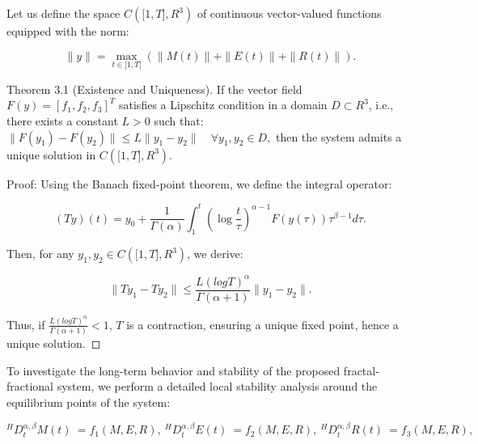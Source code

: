 \documentclass[10pt]{NSP1}
\begin{document}
Let us define the space $C\left( \lbrack 1,T\rbrack,R^{3} \right)$ of continuous vector-valued functions equipped with the norm:

\begin{equation}
\parallel y \parallel = \max_{t \in \lbrack 1,T\rbrack}\left( \parallel M(t) \parallel + \parallel E(t) \parallel + \parallel R(t) \parallel \right).

\end{equation}

Theorem 3.1 (Existence and Uniqueness). If the vector field $F(y) = \left\lbrack f_{1},f_{2},f_{3} \right\rbrack^{T}$ satisfies a Lipschitz condition in a domain $D \subset R^{3}$, i.e., there exists a constant $L > 0$ such that: $\parallel F\left( y_{1} \right) - F\left( y_{2} \right) \parallel \leq L \parallel y_{1} - y_{2} \parallel \quad\forall y_{1},y_{2} \in D,$ then the system admits a unique solution in $C\left( \lbrack 1,T\rbrack,R^{3} \right)$.

Proof: Using the Banach fixed-point theorem, we define the integral operator:

\begin{equation}
(Ty)(t) = y_{0} + \frac{1}{\Gamma(\alpha)}\int_{1}^{t}{}\left( \log\frac{t}{\tau} \right)^{\alpha - 1}F\left( y(\tau) \right)\tau^{\beta - 1}d\tau.

\end{equation}

Then, for any $y_{1},y_{2} \in C\left( \lbrack 1,T\rbrack,R^{3} \right)$, we derive:

\begin{equation}
\parallel Ty_{1} - Ty_{2} \parallel \leq \frac{L(logT)^{\alpha}}{\Gamma(\alpha + 1)} \parallel y_{1} - y_{2} \parallel .

\end{equation}

Thus, if $\frac{L(logT)^{\alpha}}{\Gamma(\alpha + 1)} < 1$, $T$ is a contraction, ensuring a unique fixed point, hence a unique solution. ◻

\par\medskip{}\smallskip

To investigate the long-term behavior and stability of the proposed fractal-fractional system, we perform a detailed local stability analysis around the equilibrium points of the system:

\begin{equation}
^{H}D_{t}^{\alpha,\beta}M(t)\  = f_{1}(M,E,R),\ ^{H}D_{t}^{\alpha,\beta}E(t)\  = f_{2}(M,E,R),\ ^{H}D_{t}^{\alpha,\beta}R(t)\  = f_{3}(M,E,R),\ 

\end{equation}
\end{document}
